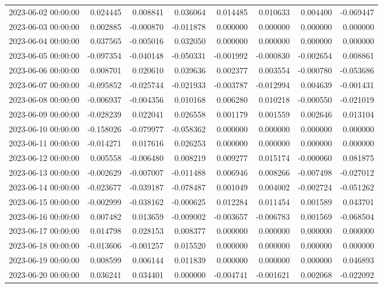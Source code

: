 \begin{tabular}{lrrrrrrr}
2023-06-02 00:00:00 & 0.024445 & 0.008841 & 0.036064 & 0.014485 & 0.010633 & 0.004400 & -0.069447 \\
2023-06-03 00:00:00 & 0.002885 & -0.000870 & -0.011878 & 0.000000 & 0.000000 & 0.000000 & 0.000000 \\
2023-06-04 00:00:00 & 0.037565 & -0.005016 & 0.032050 & 0.000000 & 0.000000 & 0.000000 & 0.000000 \\
2023-06-05 00:00:00 & -0.097354 & -0.040148 & -0.050331 & -0.001992 & -0.000830 & -0.002654 & 0.008861 \\
2023-06-06 00:00:00 & 0.008701 & 0.020610 & 0.039636 & 0.002377 & 0.003554 & -0.000780 & -0.053686 \\
2023-06-07 00:00:00 & -0.095852 & -0.025744 & -0.021933 & -0.003787 & -0.012994 & 0.004639 & -0.001431 \\
2023-06-08 00:00:00 & -0.006937 & -0.004356 & 0.010168 & 0.006280 & 0.010218 & -0.000550 & -0.021019 \\
2023-06-09 00:00:00 & -0.028239 & 0.022041 & 0.026558 & 0.001179 & 0.001559 & 0.002646 & 0.013104 \\
2023-06-10 00:00:00 & -0.158026 & -0.079977 & -0.058362 & 0.000000 & 0.000000 & 0.000000 & 0.000000 \\
2023-06-11 00:00:00 & -0.014271 & 0.017616 & 0.026253 & 0.000000 & 0.000000 & 0.000000 & 0.000000 \\
2023-06-12 00:00:00 & 0.005558 & -0.006480 & 0.008219 & 0.009277 & 0.015174 & -0.000060 & 0.081875 \\
2023-06-13 00:00:00 & -0.002629 & -0.007007 & -0.011488 & 0.006946 & 0.008266 & -0.007498 & -0.027012 \\
2023-06-14 00:00:00 & -0.023677 & -0.039187 & -0.078487 & 0.001049 & 0.004002 & -0.002724 & -0.051262 \\
2023-06-15 00:00:00 & -0.002999 & -0.038162 & -0.000625 & 0.012284 & 0.011454 & 0.001589 & 0.043701 \\
2023-06-16 00:00:00 & 0.007482 & 0.013659 & -0.009002 & -0.003657 & -0.006783 & 0.001569 & -0.068504 \\
2023-06-17 00:00:00 & 0.014798 & 0.028153 & 0.008377 & 0.000000 & 0.000000 & 0.000000 & 0.000000 \\
2023-06-18 00:00:00 & -0.013606 & -0.001257 & 0.015520 & 0.000000 & 0.000000 & 0.000000 & 0.000000 \\
2023-06-19 00:00:00 & 0.008599 & 0.006144 & 0.011839 & 0.000000 & 0.000000 & 0.000000 & 0.046893 \\
2023-06-20 00:00:00 & 0.036241 & 0.034401 & 0.000000 & -0.004741 & -0.001621 & 0.002068 & -0.022092 \\

\end{tabular}
